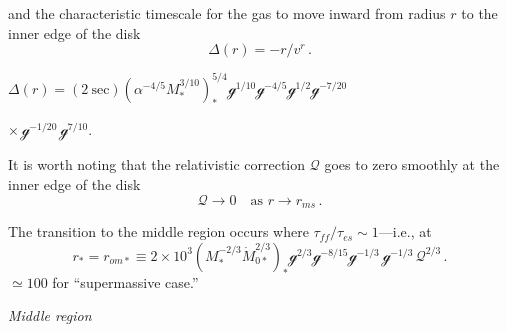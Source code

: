 

and the characteristic timescale for the gas to move inward from radius $r$ to the
inner edge of the disk
%
\begin{equation}
\tag{5.9.5}
\Delta(r) = -r/v^r\,.
\end{equation}

\noindent
$\Delta(r) = (2~\text{sec})(\alpha^{-4/5} M_*^{3/10})_*^{5/4} \mathscr{g}^{1/10} \mathscr{g}^{-4/5} \mathscr{g}^{1/2} \mathscr{g}^{-7/20}$

\noindent
$\times\,\mathscr{g}^{-1/20}\,\mathscr{g}^{7/10}$.

It is worth noting that the relativistic correction $\mathscr{Q}$ goes to zero smoothly at the
inner edge of the disk
%
\[
\mathscr{Q} \to 0 \quad \text{as } r \to r_{ms}\,.
\]

The transition to the middle region occurs where $\tau_{ff}/\tau_{es} \sim 1$---i.e., at
%
\begin{equation}
\tag{5.9.7}
r_* = r_{om*} \equiv 2 \times 10^3 (M_*^{-2/3} \dot{M}_{0*}^{2/3})_* \mathscr{g}^{2/3} \mathscr{g}^{-8/15} \mathscr{g}^{-1/3}\,\mathscr{g}^{-1/3}\,\mathscr{Q}^{2/3}\,.
\end{equation}
%
$\simeq 100$ for ``supermassive case.''

\medskip
\noindent
\textit{Middle region}

